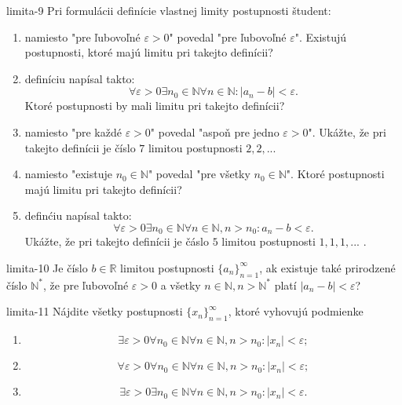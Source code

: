 \begin{defproblem}{limita-9}
Pri formulácii definície vlastnej limity postupnosti študent:
\begin{enumerate}
\item namiesto "pre ľubovoľné $\varepsilon > 0$" povedal "pre ľubovoľné $\varepsilon$". Existujú postupnosti, ktoré majú limitu pri takejto definícii?
\item definíciu napísal takto:
$$\forall \varepsilon > 0 \exists n_0 \in \mathbb{N} \forall n \in \mathbb{N}: |a_n-b|<\varepsilon.$$
Ktoré postupnosti by mali limitu pri takejto definícii?
\item namiesto "pre každé $\varepsilon > 0$" povedal "aspoň pre jedno $\varepsilon > 0$". Ukážte, že pri takejto definícii je číslo $7$ limitou postupnosti $2,2, ...$
\item namiesto "existuje $n_0 \in \mathbb{N}$" povedal "pre všetky $n_0 \in \mathbb{N}$". Ktoré postupnosti majú limitu pri takejto definícii?
\item definćiu napísal takto:
$$\forall \varepsilon > 0 \exists n_0 \in \mathbb{N} \forall n \in \mathbb{N},n>n_0:a_n-b<\varepsilon.$$
Ukážte, že pri takejto definícii je čáslo $5$ limitou postupnosti $1,1,1,...$ .
\end{enumerate}
\end{defproblem}

\begin{defproblem}{limita-10}
Je číslo $b \in \mathbb{R}$ limitou postupnosti ${\{a_n\}}_{n=1}^\infty$, ak existuje také prirodzené číslo $\mathbb{N^*}$, že pre ľubovoľné $\varepsilon>0$ a všetky $n \in \mathbb{N}, n>\mathbb{N^*}$ platí $|a_n-b|<\varepsilon$?
\end{defproblem}

\begin{defproblem}{limita-11}
Nájdite všetky postupnosti ${\{x_n\}}_{n=1}^\infty$, ktoré vyhovujú podmienke
\begin{enumerate}
\item $$\exists \varepsilon>0 \forall n_0 \in \mathbb{N} \forall n \in \mathbb{N}, n>n_0: |x_n|<\varepsilon; $$
\item $$\forall \varepsilon>0 \forall n_0 \in \mathbb{N} \forall n \in \mathbb{N}, n>n_0: |x_n|<\varepsilon; $$
\item $$\exists \varepsilon>0 \exists n_0 \in \mathbb{N} \forall n \in \mathbb{N}, n>n_0: |x_n|<\varepsilon. $$
\end{enumerate}
\end{defproblem}

